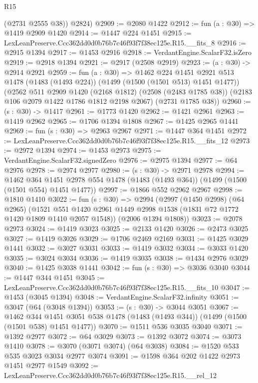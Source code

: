 \begin{lexlean}{R15}
\begin{coremodule}
        (@2731 @2555 @38))
      @2824)
@2909 := @2080 @1422
@2912 := fun (a : @30) => @1419 @2909 @1420
@2914 := @1447 @224 @1451
@2915 := LexLeanPreserve.Ccc362dd0d0b76b7c46f93f7f38ec125e.R15.__fits_8
@2916 := @2915 @1394
@2917 := @1453 @2916
@2918 := VerdantEngine.ScalarF32.isZero
@2919 := @2918 @1394
@2921 := @2917 (@2508 @2919)
@2923 := (a : @30) -> @2914 @2921
@2959 := fun (a : @30) =>
  @1462
    @224
    @1451
    @2921
    @513
    @1478
    (@1483 (@1493 @224))
    (@1499 (@1500 (@1501 @513) @1451 @1477))
    (@2562
      @511
      @2909
      @1420
      (@2168 @1812)
      (@2508 (@2483 @1785 @38))
      (@2183 @106 @2079 @1422 @1786 @1812 @2198 @2067)
      (@2731 @1785 @38))
@2960 := (s : @30) -> @1417
@2961 := @1773 @1420
@2962 := @1421 @2961
@2963 := @1419 @2962
@2965 := @1706 @1394 @1808
@2967 := @1425 @2965 @1441
@2969 := fun (s : @30) => @2963 @2967
@2971 := @1447 @364 @1451
@2972 := LexLeanPreserve.Ccc362dd0d0b76b7c46f93f7f38ec125e.R15.__fits_12
@2973 := @2972 @1394
@2974 := @1453 @2973
@2975 := VerdantEngine.ScalarF32.signedZero
@2976 := @2975 @1394
@2977 := @64 @2976
@2978 := @2974 @2977
@2980 := (s : @30) -> @2971 @2978
@2994 := @1462
    @364
    @1451
    @2978
    @554
    @1478
    (@1483 (@1493 @364))
    (@1499 (@1500 (@1501 @554) @1451 @1477))
@2997 := @1866 @552 @2962 @2967
@2998 := @1810 @1410
@3022 := fun (s : @30) =>
  @2994
    (@2997
      (@1450 @2998)
      (@64 @2965)
      (@1521 @551 @1420 @2961 @1449 @2998 @1538 (@1831 @72 @1772 @1420 @1809 @1410 @2057 @1548))
      (@2006 @1394 @1808))
@3023 := @2078 @2973
@3024 := @1419 @3023
@3025 := @2133 @1420
@3026 := @2473 @3025
@3027 := @1419 @3026
@3029 := @1706 @2469 @2169
@3031 := @1425 @3029 @1441
@3032 := @3027 @3031
@3033 := @1419 @3032
@3034 := @3033 @1420
@3035 := @3024 @3034
@3036 := @1419 @3035
@3038 := @1434 @2976 @3029
@3040 := @1425 @3038 @1441
@3042 := fun (s : @30) => @3036 @3040
@3044 := @1447 @344 @1451
@3045 := LexLeanPreserve.Ccc362dd0d0b76b7c46f93f7f38ec125e.R15.__fits_10
@3047 := @1453 (@3045 @1394)
@3048 := VerdantEngine.ScalarF32.infinity
@3051 := @3047 (@64 (@3048 @1394))
@3053 := (s : @30) -> @3044 @3051
@3067 := @1462
    @344
    @1451
    @3051
    @538
    @1478
    (@1483 (@1493 @344))
    (@1499 (@1500 (@1501 @538) @1451 @1477))
@3070 := @1511 @536 @3035 @3040
@3071 := @1392 @2977
@3072 := @64 @3029
@3073 := @1392 @3072
@3074 := @3073 @1410
@3078 := @3070 (@3071 @3074) (@64 @3038)
@3084 := @1520 @533 @535 @3023 @3034 @2977 @3074
@3091 := @1598 @364 @202 @1422 @2973 @1451 @2977 @1549
@3092 := LexLeanPreserve.Ccc362dd0d0b76b7c46f93f7f38ec125e.R15.__rel_12

\end{coremodule}
\end{lexlean}
